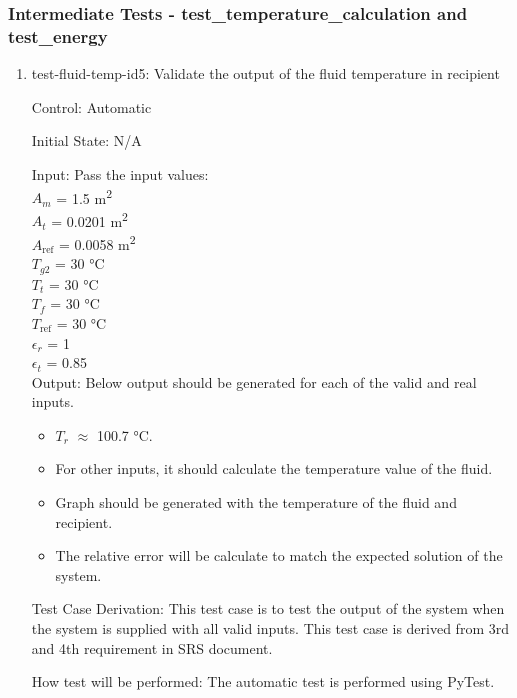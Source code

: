 \documentclass[12pt, titlepage]{article}
\begin{document}
\subsubsection{Intermediate Tests - test\_temperature\_calculation and test\_energy}
\label{intermediate_functional_tests}
\begin{enumerate}

\item{test-fluid-temp-id5: Validate the output of the fluid temperature in recipient  \\}

Control: Automatic 
					
Initial State: N/A
					
Input: Pass the input values: \\ 
       $A_m$ = 1.5 \si[per-mode=symbol] {\square\metre}\\
       $A_t$ = 0.0201 \si[per-mode=symbol] {\square\metre}\\
       $A_{\text{ref}}$ = 0.0058 \si[per-mode=symbol] {\square\metre}\\
       $T_{g2}$ = 30 \si{\celsius}\\
       $T_t$ = 30 \si{\celsius}\\
       $T_f$ = 30 \si{\celsius}\\
       $T_\text{ref}$ = 30 \si{\celsius}\\ 
       $\epsilon_r$ = 1 \\
       $\epsilon_t$ = 0.85 \\
       
					
Output: Below output should be generated for each of the valid and real inputs. 
\begin{itemize}
    \item $T_r$ $\approx$ 100.7 \si{\celsius}. 
    \item For other inputs, it should calculate the temperature value of the fluid. 
    \item Graph should be generated with the temperature of the fluid and recipient.  
    \item The relative error will be calculate to match the expected solution of the system.   
\end{itemize} 

Test Case Derivation: This test case is to test the output of the system when the system is supplied with all valid inputs. This test case is derived from 3rd and 4th requirement in SRS document.  
					
How test will be performed: The automatic test is performed using PyTest.  



\end{enumerate}
\end{document}
